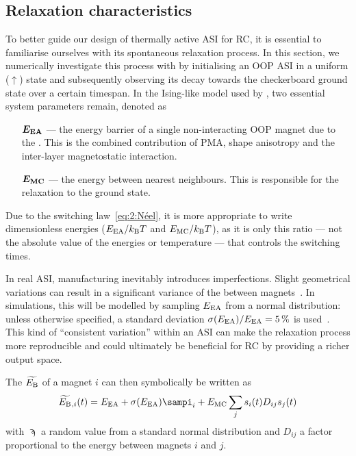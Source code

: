 \subsection{Relaxation characteristics}
\label{sec:3:relaxation}
To better guide our design of thermally active ASI for RC, it is essential to familiarise ourselves with its spontaneous relaxation process.
In this section, we numerically investigate this process with \hotspice by initialising an OOP ASI in a uniform ($\uparrow$) state and subsequently observing its decay towards the checkerboard ground state over a certain timespan.
In the Ising-like model used by \hotspice, two essential system parameters remain, denoted as
\begin{itemize}[leftmargin=4.1em]
	\item[$\boldsymbol{E_\mathrm{EA}}$ ---] the energy barrier of a single non-interacting OOP magnet due to the .
	This is the combined contribution of PMA, shape anisotropy and the inter-layer magnetostatic interaction.
	\item[$\boldsymbol{E_\mathrm{MC}}$ ---] the  energy between nearest neighbours.
	This is responsible for the relaxation to the ground state.
\end{itemize}
Due to the  switching law~\eqref{eq:2:Néel}, it is more appropriate to write dimensionless energies ($\EEA/\kBT$ and $\EMC/\kBT$), as it is only this ratio --- not the absolute value of the energies or temperature --- that controls the switching times. \par
In real ASI, manufacturing inevitably introduces imperfections.
Slight geometrical variations can result in a significant variance of the  between magnets~\cite{Budrikis2012,DisorderGroundStateASI}.
In simulations, this will be modelled by sampling $E_\mathrm{EA}$ from a normal distribution: unless otherwise specified, a standard deviation $\sigma(E_\mathrm{EA})/E_\mathrm{EA} = \SI{5}{\percent}$ is used~\cite{Farhan2013}.
This kind of ``consistent variation'' within an ASI can make the relaxation process more reproducible and could ultimately be beneficial for RC by providing a richer output space. \par
The  $\widetilde{E_\mathrm{B}}$ of a magnet $i$ can then symbolically be written as
\begin{equation}
	\label{eq:3:OOP_relaxation_EBeff}
	\EBeff{}_{,i}(t) = \EEA + \sigma(\EEA) \sampi_i + \EMC \sum_j s_i(t) D_{ij} s_j(t)
\end{equation}
with $\sampi$ a random value from a standard normal distribution and $D_{ij}$ a factor proportional to the  energy between magnets $i$ and $j$. \\\par

